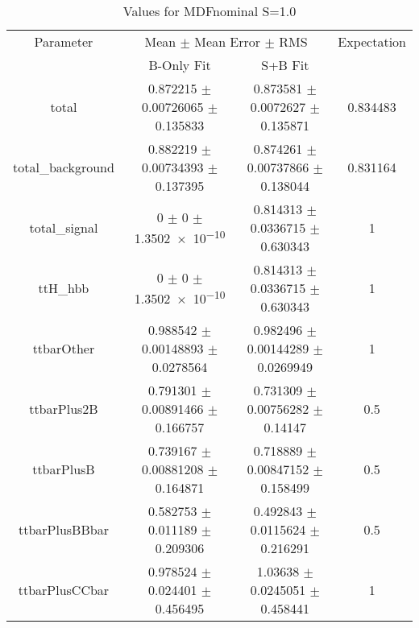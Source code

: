 \begin{table}
\centering
\caption{Values for MDFnominal S=1.0}
\begin{tabular}{cccc}
\toprule
Parameter & \multicolumn{2}{c}{Mean $\pm$ Mean Error $\pm$ RMS} & Expectation\\
 & B-Only Fit & S+B Fit & \\
\midrule
total & \num{0.872215} $\pm$ \num{0.00726065} $\pm$ \num{0.135833} & \num{0.873581} $\pm$ \num{0.0072627} $\pm$ \num{0.135871} & \num{0.834483}\\
total\_background & \num{0.882219} $\pm$ \num{0.00734393} $\pm$ \num{0.137395} & \num{0.874261} $\pm$ \num{0.00737866} $\pm$ \num{0.138044} & \num{0.831164}\\
total\_signal & \num{0} $\pm$ \num{0} $\pm$ \num{1.3502e-10} & \num{0.814313} $\pm$ \num{0.0336715} $\pm$ \num{0.630343} & \num{1}\\
ttH\_hbb & \num{0} $\pm$ \num{0} $\pm$ \num{1.3502e-10} & \num{0.814313} $\pm$ \num{0.0336715} $\pm$ \num{0.630343} & \num{1}\\
ttbarOther & \num{0.988542} $\pm$ \num{0.00148893} $\pm$ \num{0.0278564} & \num{0.982496} $\pm$ \num{0.00144289} $\pm$ \num{0.0269949} & \num{1}\\
ttbarPlus2B & \num{0.791301} $\pm$ \num{0.00891466} $\pm$ \num{0.166757} & \num{0.731309} $\pm$ \num{0.00756282} $\pm$ \num{0.14147} & \num{0.5}\\
ttbarPlusB & \num{0.739167} $\pm$ \num{0.00881208} $\pm$ \num{0.164871} & \num{0.718889} $\pm$ \num{0.00847152} $\pm$ \num{0.158499} & \num{0.5}\\
ttbarPlusBBbar & \num{0.582753} $\pm$ \num{0.011189} $\pm$ \num{0.209306} & \num{0.492843} $\pm$ \num{0.0115624} $\pm$ \num{0.216291} & \num{0.5}\\
ttbarPlusCCbar & \num{0.978524} $\pm$ \num{0.024401} $\pm$ \num{0.456495} & \num{1.03638} $\pm$ \num{0.0245051} $\pm$ \num{0.458441} & \num{1}\\
\bottomrule
\end{tabular}
\end{table}